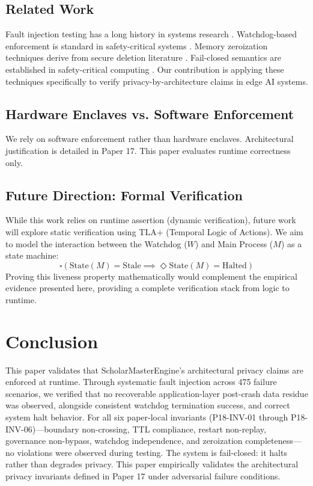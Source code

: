 \documentclass[conference]{IEEEtran}
\begin{document}
\subsection{Related Work}
Fault injection testing has a long history in systems research \cite{b1, b2}. Watchdog-based enforcement is standard in safety-critical systems \cite{b3}. Memory zeroization techniques derive from secure deletion literature \cite{b4}. Fail-closed semantics are established in safety-critical computing \cite{b5}. Our contribution is applying these techniques specifically to verify privacy-by-architecture claims in edge AI systems.

\subsection{Hardware Enclaves vs. Software Enforcement}
We rely on software enforcement rather than hardware enclaves. Architectural justification is detailed in Paper 17. This paper evaluates runtime correctness only.

\subsection{Future Direction: Formal Verification}
While this work relies on runtime assertion (dynamic verification), future work will explore static verification using TLA+ (Temporal Logic of Actions). We aim to model the interaction between the Watchdog ($W$) and Main Process ($M$) as a state machine:
\begin{equation}
\square (\text{State}(M) = \text{Stale} \implies \Diamond \text{State}(M) = \text{Halted})
\end{equation}
Proving this liveness property mathematically would complement the empirical evidence presented here, providing a complete verification stack from logic to runtime.

\section{Conclusion}

This paper validates that ScholarMasterEngine's architectural privacy claims are enforced at runtime. Through systematic fault injection across 475 failure scenarios, we verified that no recoverable application-layer post-crash data residue was observed, alongside consistent watchdog termination success, and correct system halt behavior. For all six paper-local invariants (P18-INV-01 through P18-INV-06)---boundary non-crossing, TTL compliance, restart non-replay, governance non-bypass, watchdog independence, and zeroization completeness---no violations were observed during testing. The system is fail-closed: it halts rather than degrades privacy. This paper empirically validates the architectural privacy invariants defined in Paper 17 under adversarial failure conditions.
\end{document}
